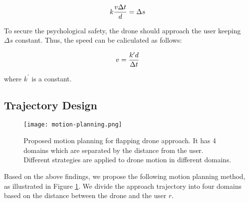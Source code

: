 \begin{equation}
    k{v\Delta t\over d}=\Delta s
\end{equation}

To secure the psychological safety, the drone should approach the user keeping $\Delta s$ constant.
Thus, the speed can be caliculated as follows:

\begin{equation}
    v = {k^\prime d\over \Delta t}
    \label{eq:speed}
\end{equation}

where $k^\prime$ is a constant.

\subsection{Trajectory Design}
\label{sec:trajectory}

\begin{figure}[t]
    \centering
    \texttt{[image: motion-planning.png]}
    \caption{Proposed motion planning for flapping drone approach. It has 4 domains which are separated by the distance from the user. Different strategies are applied to drone motion in different domains.
    }
    \label{fig:trajectory}
\end{figure}

Based on the above findings, we propose the following motion planning method, as illustrated in Figure \ref{fig:trajectory}.
We divide the approach trajectory into four domains based on the distance between the drone and the user $r$.

